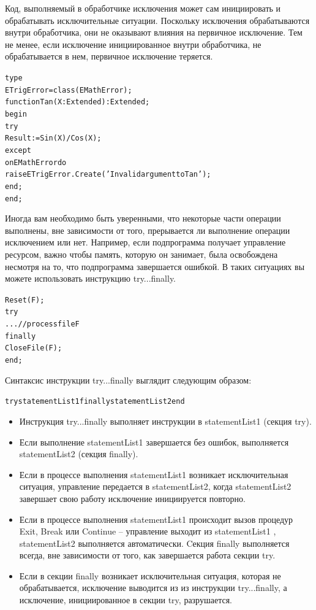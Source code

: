 \documentclass{beamer}
\begin{document}
\begin{frame}[fragile]
Код, выполняемый в обработчике исключения может сам инициировать и обрабатывать исключительные ситуации. Поскольку исключения обрабатываются внутри обработчика, они не оказывают влияния на первичное исключение. Тем не менее, если исключение инициированное внутри обработчика, не обрабатывается в нем, первичное исключение теряется.
\begin{alltt}
type
   ETrigError = class(EMathError);
   function Tan(X: Extended): Extended;
   begin
      try
        Result := Sin(X) / Cos(X);
      except
        on EMathError do
        raise ETrigError.Create('Invalid argument to Tan');
      end;
   end;
\end{alltt}
\end{frame}

\begin{frame}[fragile]
Иногда вам необходимо быть уверенными, что некоторые части операции выполнены, вне зависимости от того, прерывается ли выполнение операции исключением или нет. Например, если подпрограмма получает управление ресурсом, важно чтобы память, которую он занимает, была освобождена несмотря на то, что подпрограмма завершается ошибкой. В таких ситуациях вы можете использовать инструкцию try...finally.
\begin{alltt}
Reset(F);
try
   ... // process file F
finally
   CloseFile(F);
end;
\end{alltt}
\end{frame}

\begin{frame}[fragile]
Синтаксис инструкции try...finally выглядит следующим образом:
\begin{alltt}
try statementList1 finally statementList2 end
\end{alltt}
\begin{itemize}
\item Инструкция try...finally выполняет инструкции в statementList1 (секция try). 
\item Если выполнение statementList1 завершается без ошибок, выполняется statementList2 (секция finally). 
\item Если в процессе выполнения statementList1 возникает исключительная ситуация, управление передается в statementList2, когда statementList2 завершает свою работу исключение инициируется повторно. 
\item Если в процессе выполнения statementList1 происходит вызов процедур Exit, Break или Continue – управление выходит из statementList1 , statementList2 выполняется автоматически.
Cекция finally выполняется всегда, вне зависимости от того, как завершается работа секции try.
\item Если в секции finally возникает исключительная ситуация, которая не обрабатывается, исключение выводится из из инструкции try...finally, а исключение, инициированное в секции try, разрушается. 
\end{itemize}
\end{frame}
\end{document}
